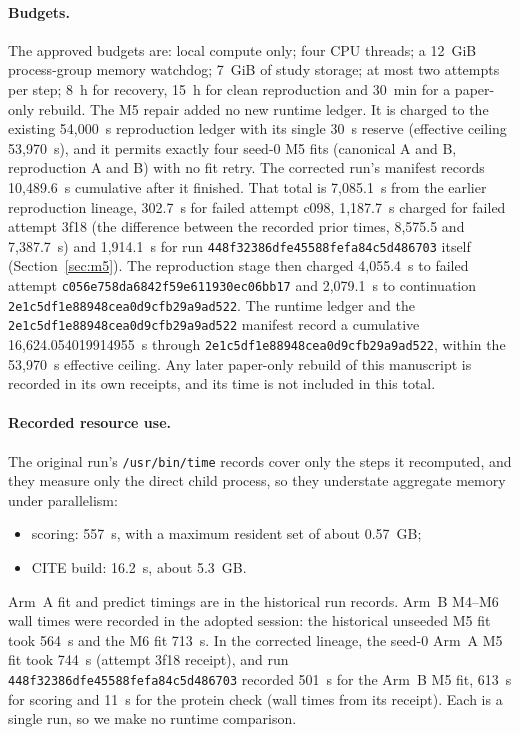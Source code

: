 \documentclass[11pt]{article}
\newcommand{\runid}{\nolinkurl{448f32386dfe45588fefa84c5d486703}}
\newcommand{\cfailid}{\nolinkurl{c056e758da6842f59e611930ec06bb17}}
\newcommand{\ccontid}{\nolinkurl{2e1c5df1e88948cea0d9cfb29a9ad522}}
\begin{document}
\paragraph{Budgets.} The approved budgets are: local compute only; four CPU threads; a 12~GiB process-group memory watchdog; 7~GiB of study storage; at most two attempts per step; 8~h for recovery, 15~h for clean reproduction and 30~min for a paper-only rebuild. The M5 repair added no new runtime ledger. It is charged to the existing 54{,}000~s reproduction ledger with its single 30~s reserve (effective ceiling 53{,}970~s), and it permits exactly four seed-0 M5 fits (canonical A and B, reproduction A and B) with no fit retry. The corrected run's manifest records 10{,}489.6~s cumulative after it finished. That total is 7{,}085.1~s from the earlier reproduction lineage, 302.7~s for failed attempt c098, 1{,}187.7~s charged for failed attempt 3f18 (the difference between the recorded prior times, 8{,}575.5 and 7{,}387.7~s) and 1{,}914.1~s for run \runid{} itself (Section~\ref{sec:m5}). The reproduction stage then charged 4{,}055.4~s to failed attempt \cfailid{} and 2{,}079.1~s to continuation \ccontid. The runtime ledger and the \ccontid{} manifest record a cumulative 16{,}624.054019914955~s through \ccontid, within the 53{,}970~s effective ceiling. Any later paper-only rebuild of this manuscript is recorded in its own receipts, and its time is not included in this total.

\paragraph{Recorded resource use.} The original run's \texttt{/usr/bin/time} records cover only the steps it recomputed, and they measure only the direct child process, so they understate aggregate memory under parallelism:
\begin{itemize}
\item scoring: 557~s, with a maximum resident set of about 0.57~GB;
\item CITE build: 16.2~s, about 5.3~GB.
\end{itemize}
Arm~A fit and predict timings are in the historical run records. Arm~B M4--M6 wall times were recorded in the adopted session: the historical unseeded M5 fit took 564~s and the M6 fit 713~s. In the corrected lineage, the seed-0 Arm~A M5 fit took 744~s (attempt 3f18 receipt), and run \runid{} recorded 501~s for the Arm~B M5 fit, 613~s for scoring and 11~s for the protein check (wall times from its receipt). Each is a single run, so we make no runtime comparison.
\end{document}
